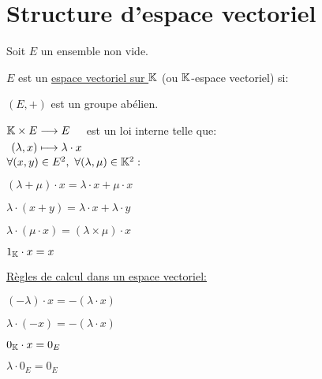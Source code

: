 \documentclass[12pt,twoside,a4paper]{article}
\author{MPSI 2}
\begin{document}
	\maketitle
	\section{Structure d'espace vectoriel}
		Soit $E$ un ensemble non vide.
		\begin{defi}
			$E$ est un \underline{espace vectoriel sur $\mathbb{K}$} (ou $\mathbb{K}$-espace vectoriel) si:
			\begin{liste}
				\item $(E,+)$ est un groupe abélien.
				\item $\begin{aligned}[t]\mathbb{K}\times E&\longrightarrow E \\(\lambda,x)&\longmapsto \lambda\cdot x\end{aligned}$ est un loi interne telle que:\\
				$\forall (x,y)\in E^{2},\ \forall (\lambda,\mu)\in\mathbb{K}^{2}:$
				\begin{liste}
					\item $(\lambda+\mu)\cdot x=\lambda\cdot x+\mu\cdot x$
					\item $\lambda\cdot(x+y)=\lambda\cdot x+\lambda\cdot y$
					\item $\lambda\cdot(\mu\cdot x)=(\lambda\times\mu)\cdot x$
					\item $1_{\mathbb{K}}\cdot x=x$
				\end{liste}
			\end{liste}
		\end{defi}
		\begin{flushleft}
			\underline{Règles de calcul dans un espace vectoriel:}
			\begin{liste}
				\item $(-\lambda)\cdot x=-(\lambda\cdot x)$
				\item $\lambda\cdot (-x)=-(\lambda\cdot x)$
				\item $0_{\mathbb{K}}\cdot x=0_E$
				\item $\lambda\cdot 0_E=0_E$
			\end{liste}
		\end{flushleft}
\end{document}
